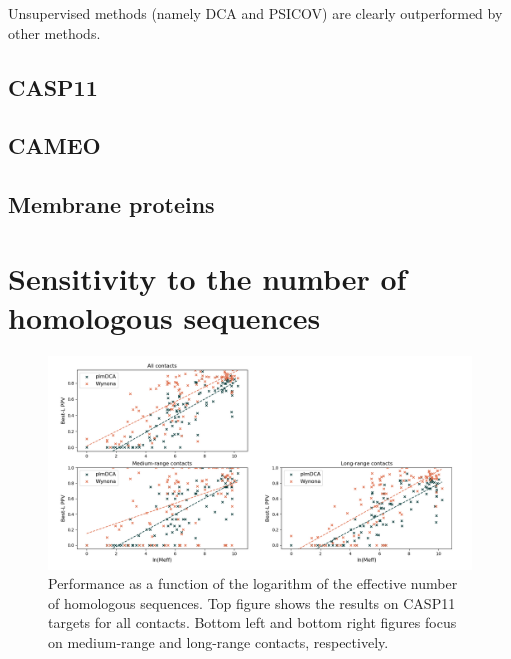     Unsupervised methods (namely DCA and PSICOV) are clearly outperformed by other methods.

    \subsection{CASP11}


        \todo{}

    \subsection{CAMEO}

        \todo{}

    \subsection{Membrane proteins}

        \todo{}

\section{Sensitivity to the number of homologous sequences}

    \begin{figure}[H]
        \begin{center}
            \includegraphics[width=\textwidth, keepaspectratio]{imgs/Meff.png}
            \caption{Performance as a function of the logarithm of the effective
            number of homologous sequences. Top figure shows the results on
            CASP11 targets for all contacts. Bottom left and bottom right figures
            focus on medium-range and long-range contacts, respectively.}
            \label{sensitivity}
        \end{center}
    \end{figure}

